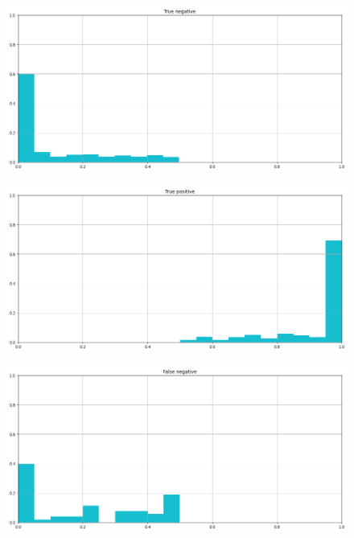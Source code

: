 \documentclass[12pt]{report}
\theoremstyle{definition}
\begin{document}
\begin{figure}
\centering
    \begin{minipage}{0.48\textwidth}
     \includegraphics[width=\linewidth]{images/experiment kaggle/tn.png}\label{tn_k}
   \end{minipage}
   \begin{minipage}{0.48\textwidth}
     \includegraphics[width=\linewidth]{images/experiment kaggle/tp.png}\label{tp_k}
   \end{minipage}
   \begin{minipage}{0.48\textwidth}
     \includegraphics[width=\linewidth]{images/experiment kaggle/fn.png}\label{fn_k}
   \end{minipage}

\end{figure}
\end{document}
